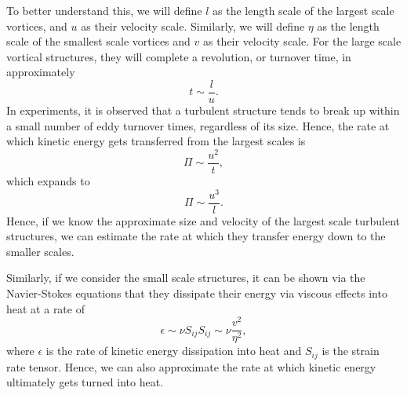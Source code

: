 To better understand this, we will define $l$ as the length scale of the largest scale vortices, and $u$ as their velocity scale. Similarly, we will define $\eta$ as the length scale of the smallest scale vortices and $v$ as their velocity scale. For the large scale vortical structures, they will complete a revolution, or turnover time, in approximately
\begin{equation}
	t \sim \frac{l}{u}.
\end{equation}
In experiments, it is observed that a turbulent structure tends to break up within a small number of eddy turnover times, regardless of its size. Hence, the rate at which kinetic energy gets transferred from the largest scales is
\begin{equation}
	\Pi \sim \frac{u^2}{t},
\end{equation}
which expands to 
\begin{equation}
	\Pi \sim \frac{u^3}{l}.
\end{equation}
Hence, if we know the approximate size and velocity of the largest scale turbulent structures, we can estimate the rate at which they transfer energy down to the smaller scales.

Similarly, if we consider the small scale structures, it can be shown via the Navier-Stokes equations that they dissipate their energy via viscous effects into heat at a rate of~\cite{davidson2015turbulence}
\begin{equation}
	\epsilon \sim \nu S_{ij} S_{ij} \sim \nu \frac{v^2}{\eta^2},
\end{equation}
where $\epsilon$ is the rate of kinetic energy dissipation into heat and $S_{ij}$ is the strain rate tensor. Hence, we can also approximate the rate at which kinetic energy ultimately gets turned into heat.

